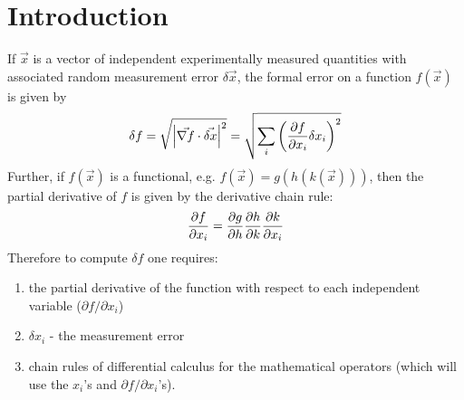 \documentclass[12pt]{article}
\begin{document}
\newpage
\tableofcontents
\newpage
            
            
            
            

\section{Introduction}

If $\vec x$ is a vector of independent experimentally measured
quantities with associated random measurement error $\delta \vec
x$, the formal error on a function $f(\vec x)$ is given by
\begin{equation}
  \delta f = \sqrt{\left| \vec{\nabla f} \cdot \vec{\delta x}\right|^2} = \sqrt{\sum_i {\left( {\partial f \over {\partial x_i}} 
        \delta x_i \right)}^2}
\label{FERR}
\end{equation}
Further, if $f(\vec x)$ is a functional, e.g. $f(\vec x)=g(h(k(\vec
x)))$, then the partial derivative of $f$ is given by the derivative
chain rule:
\begin{equation}
{\partial f \over \partial x_i} = {\partial g \over \partial h} 
{\partial h \over \partial k} {\partial k \over \partial x_i}
\label{DFUNCTIONAL}
\end{equation}
Therefore to compute $\delta f$ one requires:
\begin{enumerate}
\item the partial derivative of the function with respect to each
independent variable ($\partial f / \partial x_i$)
\item $\delta x_i$ - the measurement error
\item chain rules of differential calculus for the
mathematical operators (which will use the $x_i$'s and $\partial f /
\partial x_i$'s).  
\end{enumerate}
\end{document}
